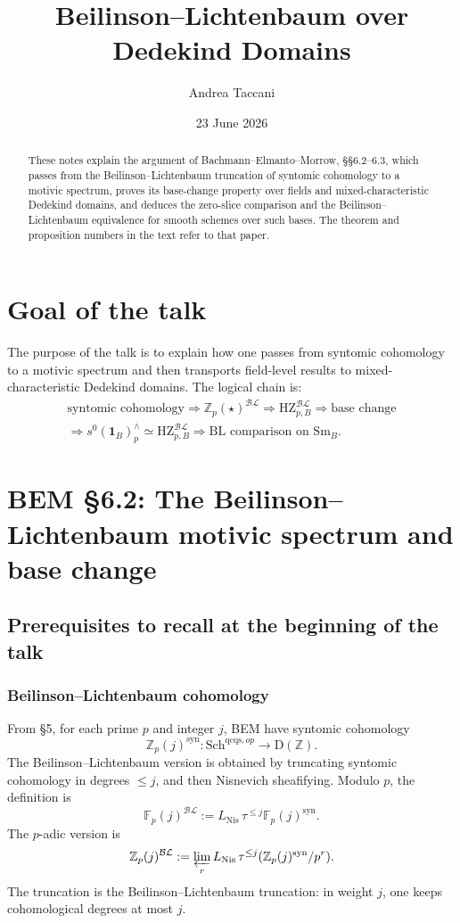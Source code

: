 \documentclass[11pt,a4paper]{article}
\title{Beilinson--Lichtenbaum over Dedekind Domains}
\author{Andrea Taccani}
\date{23 June 2026}
\newcommand{\Z}{\mathbb Z}
\newcommand{\F}{\mathbb F}
\newcommand{\Sm}{\mathrm{Sm}}
\newcommand{\Sch}{\mathrm{Sch}}
\newcommand{\D}{\mathrm{D}}
\newcommand{\Nis}{\mathrm{Nis}}
\newcommand{\BL}{\mathcal{BL}}
\newcommand{\syn}{\mathrm{syn}}
\newcommand{\HZ}{\mathrm{HZ}}
\newcommand{\1}{\mathbf 1}
\theoremstyle{bemstyle}
\theoremstyle{definition}
\begin{document}
\maketitle

\begin{abstract}
These notes explain the argument of Bachmann--Elmanto--Morrow, \S\S6.2--6.3, which passes from the Beilinson--Lichtenbaum truncation of syntomic cohomology to a motivic spectrum, proves its base-change property over fields and mixed-characteristic Dedekind domains, and deduces the zero-slice comparison and the Beilinson--Lichtenbaum equivalence for smooth schemes over such bases. The theorem and proposition numbers in the text refer to that paper.
\end{abstract}

\tableofcontents

\section{Goal of the talk}

The purpose of the talk is to explain how one passes from syntomic cohomology to a motivic spectrum and then transports field-level results to mixed-characteristic Dedekind domains. The logical chain is:
\[
\begin{gathered}
\text{syntomic cohomology}
\Rightarrow \Z_p(\star)^{\BL}
\Rightarrow \HZ^{\BL}_{p,B}
\Rightarrow \text{base change}\\[0.35em]
\Rightarrow s^0(\1_B)^\wedge_p\simeq \HZ^{\BL}_{p,B}
\Rightarrow \text{BL comparison on }\Sm_B.
\end{gathered}
\]

\section{BEM \S6.2: The Beilinson--Lichtenbaum motivic spectrum and base change}

\subsection{Prerequisites to recall at the beginning of the talk}

\subsubsection{Beilinson--Lichtenbaum cohomology}

From \S5, for each prime \(p\) and integer \(j\), BEM have syntomic cohomology
\[
  \Z_p(j)^{\syn} : \Sch^{\mathrm{qcqs},op}\longrightarrow \D(\Z).
\]
The Beilinson--Lichtenbaum version is obtained by truncating syntomic cohomology in degrees \(\leq j\), and then Nisnevich sheafifying. Modulo \(p\), the definition is
\[
  \F_p(j)^{\BL}:=L_{\Nis}\,\tau^{\leq j}\F_p(j)^{\syn}.
\]
The \(p\)-adic version is
\[
  \Z_p(j)^{\BL}:=\varprojlim_{r} L_{\Nis}\,\tau^{\leq j}(\Z_p(j)^{\syn}/p^r).
\]
The truncation is the Beilinson--Lichtenbaum truncation: in weight \(j\), one keeps cohomological degrees at most \(j\). 
\end{document}
